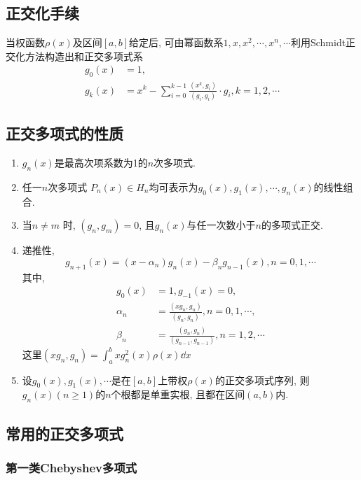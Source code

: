 \subsection{正交化手续}

当权函数$\rho(x)$及区间$[a,b]$给定后, 可由幂函数系${1,x,x^2,\cdots,x^n,\cdots}$利用Schmidt正交化方法构造出和正交多项式系
\begin{align*}
    g_0(x)&=1,\\
    g_k(x)&=x^k-\sum_{i=0}^{k-1}\frac{(x^k,g_i)}{(g_i,g_i)}\cdot g_i, k=1,2,\cdots
\end{align*}

\subsection{正交多项式的性质}

\begin{enumerate}
    \item $g_n(x)$是最高次项系数为1的$n$次多项式.
    \item 任一$n$次多项式 $P_n(x)\in H_n$均可表示为$g_0(x),g_1(x),\cdots,g_n(x)$的线性组合.
    \item 当$n\ne m$ 时, $(g_n,g_m)=0$, 且$g_n(x)$与任一次数小于$n$的多项式正交.
    \item 递推性, 
    \begin{equation*}
        g_{n+1}(x)=(x-\alpha_n)g_n(x)-\beta_ng_{n-1}(x), n=0,1,\cdots
    \end{equation*}
    其中, 
    \begin{align*}
        g_0(x)&=1, g_{-1}(x)=0,\\
        \alpha_n&=\frac{(xg_n,g_n)}{(g_n,g_n)}, n=0,1,\cdots,\\
        \beta_n&=\frac{(g_n,g_n)}{(g_{n-1},g_{n-1})}, n=1,2,\cdots
    \end{align*}
    这里$(xg_n,g_n)=\int_a^bxg_n^2(x)\rho(x)\dd{x}$
    \item 设$g_0(x),g_1(x),\cdots$是在$[a,b]$上带权$\rho(x)$的正交多项式序列, 则$g_n(x)(n\ge1)$的$n$个根都是单重实根, 且都在区间$(a,b)$内.
\end{enumerate}

\subsection{常用的正交多项式}

\subsubsection{第一类Chebyshev多项式}

